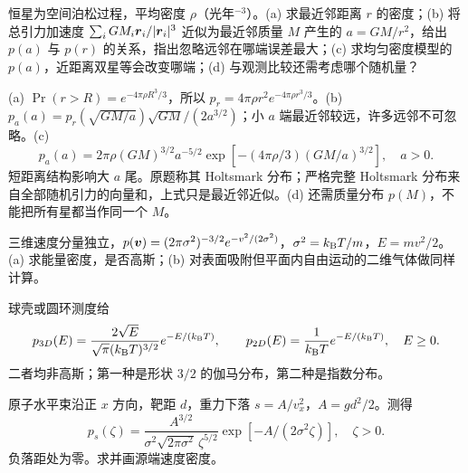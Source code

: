 \begin{center}\hspace{.3cm}\end{center}
\begin{exercise}
恒星为空间泊松过程，平均密度 $\rho$（光年$^{-3}$）。(a) 求最近邻距离 $r$ 的密度；(b) 将总引力加速度 $\sum_i GM_i\boldsymbol{r}_i/|\boldsymbol{r}_i|^3$ 近似为最近邻质量 $M$ 产生的 $a=GM/r^2$，给出 $p(a)$ 与 $p(r)$ 的关系，指出忽略远邻在哪端误差最大；(c) 求均匀密度模型的 $p(a)$，近距离双星等会改变哪端；(d) 与观测比较还需考虑哪个随机量？
\end{exercise}
\begin{solution}
(a) $\Pr(r>R)=e^{-4\pi\rho R^3/3}$，所以 $p_r=4\pi\rho r^2e^{-4\pi\rho r^3/3}$。(b) $p_a(a)=p_r(\sqrt{GM/a})\sqrt{GM}/(2a^{3/2})$；小 $a$ 端最近邻较远，许多远邻不可忽略。(c)
\[p_a(a)=2\pi\rho(GM)^{3/2}a^{-5/2}\exp[-(4\pi\rho/3)(GM/a)^{3/2}],\quad a>0.\]
短距离结构影响大 $a$ 尾。原题称其 Holtsmark 分布；严格完整 Holtsmark 分布来自全部随机引力的向量和，上式只是最近邻近似。(d) 还需质量分布 $p(M)$，不能把所有星都当作同一个 $M$。
\end{solution}
\begin{exercise}
三维速度分量独立，$p(\boldsymbol{v})=(2\pi\sigma^2)^{-3/2}e^{-v^2/(2\sigma^2)}$，$\sigma^2=k_{\mathrm B} T/m$，$E=mv^2/2$。(a) 求能量密度，是否高斯；(b) 对表面吸附但平面内自由运动的二维气体做同样计算。
\end{exercise}
\begin{solution}
球壳或圆环测度给
\[p_{3D}(E)=\frac{2\sqrt E}{\sqrt\pi(k_{\mathrm B} T)^{3/2}}e^{-E/(k_{\mathrm B} T)},\qquad p_{2D}(E)=\frac1{k_{\mathrm B} T}e^{-E/(k_{\mathrm B} T)},\quad E\ge0.\]
二者均非高斯；第一种是形状 $3/2$ 的伽马分布，第二种是指数分布。
\end{solution}
\begin{exercise}
原子水平束沿正 $x$ 方向，靶距 $d$，重力下落 $s=A/v_x^2$，$A=gd^2/2$。测得
\[p_s(\zeta)=\frac{A^{3/2}}{\sigma^2\sqrt{2\pi\sigma^2}\,\zeta^{5/2}}\exp[-A/(2\sigma^2\zeta)],\quad\zeta>0.\]
负落距处为零。求并画源端速度密度。
\end{exercise}
